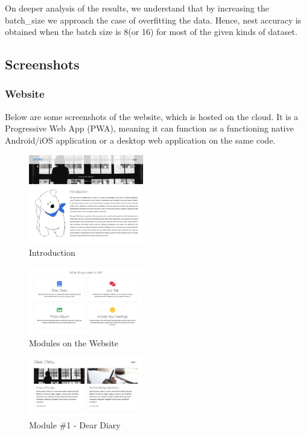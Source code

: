 \documentclass[conference,compsoc]{IEEEtran}
\begin{document}
On deeper analysis of the results, we understand that by increasing the batch\_size we approach the case of overfitting the data. Hence, nest accuracy is obtained when the batch size is 8(or 16) for most of the given kinds of dataset.


\subsection{Screenshots}

\subsubsection{Website}

\noindent
Below are some screenshots of the website, which is hosted on the cloud. It is a Progressive Web App (PWA), meaning it can function as a functioning native Android/iOS application or a desktop web application on the same code.

\begin{figure}[H]
    \centering
    \includegraphics[width=5cm]{images/screenshots/website/website-introduction.png}
    \caption{Introduction}
\end{figure}

\begin{figure}[H]
    \centering
    \includegraphics[width=5cm]{images/screenshots/website/website-modules.png}
    \caption{Modules on the Website}
\end{figure}

\begin{figure}[H]
    \centering
    \includegraphics[width=5cm]{images/screenshots/website/website-dear-diary.png}
    \caption{Module \#1 - Dear Diary}
\end{figure}
\end{document}
